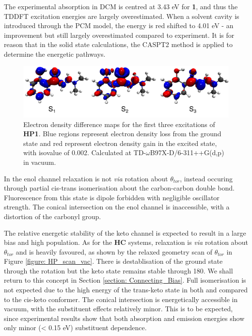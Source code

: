 The experimental absorption in DCM is centred at 3.43 eV for \textbf{1}, and thus the TDDFT excitation energies are largely overestimated. When a solvent cavity is introduced through the \ac{PCM} model, the \sone{} energy is red shifted to 4.01 eV - an improvement but still largely overestimated compared to experiment. It is for reason that in the solid state calculations, the CASPT2 method is applied to determine the energetic pathways.
\begin{figure}[b]
\centering
  \includegraphics[width=0.9\linewidth]{5ConnectingCrystalStructure/monomer_excitations.pdf}
  \caption[Electron density difference maps for the first three excitations of \textbf{HP1}.]{Electron density difference maps for the first three excitations of \textbf{HP1}. Blue regions represent electron density loss from the ground state and red represent electron density gain in the excited state, with isovalue of 0.002. Calculated at TD-$\omega$B97X-D/6-311++G(d,p) in vacuum.}
  \label{figure: monomer_excitations}
\end{figure}


In the enol channel relaxation is not \textit{via} rotation about $\theta_{tor}$, instead occuring through partial cis-trans isomerisation about the carbon-carbon double bond. Fluorescence from this state is dipole forbidden with negligible oscillator strength. The conical intersection on the enol channel is inaccessible, with a distortion of the carbonyl group.

The relative energetic stability of the keto channel is expected to result in a large bias and high population. As for the \textbf{HC} systems, relaxation is \textit{via} rotation about $\theta_{tor}$ and is heavily favoured, as shown by the relaxed geometry scan of $\theta_{tor}$ in Figure \ref{figure: HP_scan_vac}. There is destablisation of the ground state through the rotation but the keto state remains stable through 180\degree{}. We shall return to this concept in Section \ref{section: Connecting_Bias}. Full isomerisation is not expected due to the high energy of the trans-keto state in both \sone{} and \szero{} compared to the cis-keto conformer. The conical intersection is energetically accessible in vacuum, with the substituent effects relatively minor. This is to be expected, since experimental results show that both absorption and emission energies show only minor (\textless{} 0.15 eV) substituent dependence. 

